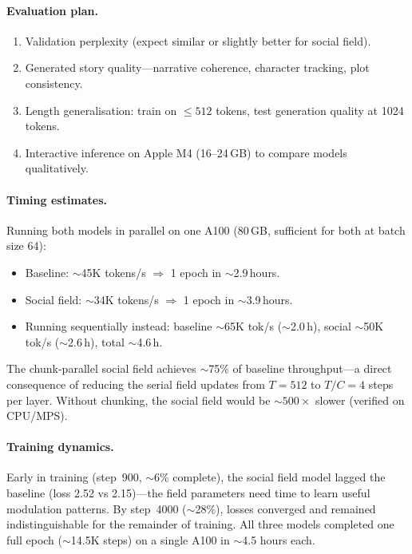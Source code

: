 \documentclass[11pt,a4paper]{article}
\begin{document}
\paragraph{Evaluation plan.}
\begin{enumerate}
    \item Validation perplexity (expect similar or slightly better
          for social field).
    \item Generated story quality---narrative coherence, character
          tracking, plot consistency.
    \item Length generalisation: train on $\leq 512$ tokens, test
          generation quality at 1024 tokens.
    \item Interactive inference on Apple M4 (16--24\,GB) to compare
          models qualitatively.
\end{enumerate}

\paragraph{Timing estimates.}
Running both models in parallel on one A100 (80\,GB, sufficient for
both at batch size 64):
\begin{itemize}
    \item Baseline: $\sim$45K tokens/s $\Rightarrow$ 1 epoch in
          $\sim$2.9\,hours.
    \item Social field: $\sim$34K tokens/s $\Rightarrow$ 1 epoch in
          $\sim$3.9\,hours.
    \item Running sequentially instead: baseline $\sim$65K tok/s
          ($\sim$2.0\,h), social $\sim$50K tok/s ($\sim$2.6\,h),
          total $\sim$4.6\,h.
\end{itemize}
The chunk-parallel social field achieves $\sim$75\% of baseline
throughput---a direct consequence of reducing the serial field updates
from $T = 512$ to $T/C = 4$ steps per layer.  Without chunking, the
social field would be $\sim 500\times$ slower (verified on CPU/MPS).

\paragraph{Training dynamics.}
Early in training (step~900, $\sim$6\% complete), the social field
model lagged the baseline (loss 2.52 vs 2.15)---the field parameters
need time to learn useful modulation patterns.  By step~4000
($\sim$28\%), losses converged and remained indistinguishable for the
remainder of training.  All three models completed one full epoch
($\sim$14.5K steps) on a single A100 in $\sim$4.5 hours each.
\end{document}

